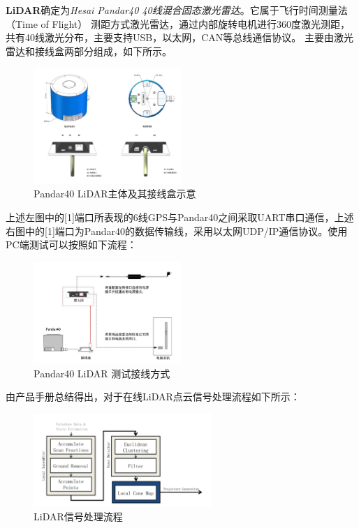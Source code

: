 \textbf{LiDAR}确定为\emph{Hesai Pandar40 40线混合固态激光雷达}。它属于飞行时间测量法（Time of Flight） 测距方式激光雷达，通过内部旋转电机进行360度激光测距，共有40线激光分布，主要支持USB，以太网，CAN等总线通信协议。
主要由激光雷达和接线盒两部分组成，如下所示。

\begin{figure}[H]
	\centering
	\includegraphics[width = 0.5\textwidth]{fig/LiDAR_IO.png}
	\caption{Pandar40 LiDAR主体及其接线盒示意}
	\label{LiDAR主体及其接线盒端口}
\end{figure}

上述左图中的[1]端口所表现的6线GPS与Pandar40之间采取UART串口通信，上述右图中的[1]端口为Pandar40的数据传输线，采用以太网UDP/IP通信协议。使用PC端测试可以按照如下流程：

\begin{figure}[H]
	\centering
	\includegraphics[width = 0.5\textwidth]{fig/LiDAR_test.png}
	\caption{Pandar40 LiDAR 测试接线方式}
	\label{LiDAR_test}
\end{figure}

由产品手册总结得出，对于在线LiDAR点云信号处理流程如下所示：

\begin{figure}[H]
	\centering
	\includegraphics[width = 0.6\textwidth]{fig/LiDAR_pipeline.png}
	\caption{LiDAR信号处理流程}
	\label{LiDAR_pipeline}
\end{figure}

